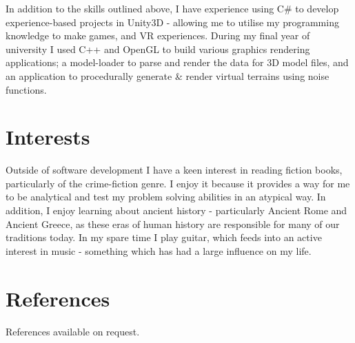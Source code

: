\documentclass[11pt]{article}
\begin{document}
\newline\newline
In addition to the skills outlined above, I have experience using C\# to develop experience-based projects in Unity3D - allowing me to utilise my programming knowledge to make games, and VR experiences. During my final year of university I used C++ and OpenGL to build various graphics rendering applications;  a model-loader to parse and render the data for 3D model files, and an application to procedurally generate \& render virtual terrains using noise functions.

\section*{Interests}
\vspace*{-10pt}
Outside of software development I have a keen interest in reading fiction books, particularly of the crime-fiction genre. I enjoy it because it provides a way for me to be analytical and test my problem solving abilities in an atypical way. In addition, I enjoy learning about ancient history - particularly Ancient Rome and Ancient Greece, as these eras of human history are responsible for many of our traditions today. In my spare time I play guitar, which feeds into an active interest in music - something which has had a large influence on my life.


\section*{References}
\vspace*{-10pt}
References available on request.

\end{document}
